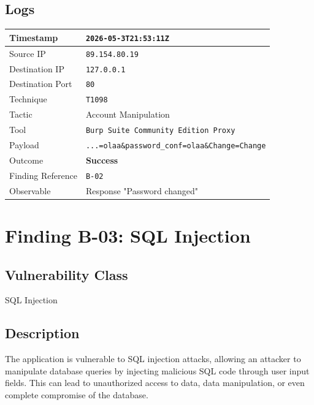 \documentclass[11pt,a4paper]{report}
\begin{document}
    \subsection*{Logs}
    
    \begin{table}[h!]
    \centering
    \renewcommand{\arraystretch}{1.3}
    \begin{tabular}{|p{4cm}|p{9cm}|}
    \hline
    Timestamp & \texttt{2026-05-3T21:53:11Z} \\
    \hline
    Source IP & \texttt{89.154.80.19} \\
    \hline
    Destination IP & \texttt{127.0.0.1} \\
    \hline
    Destination Port & \texttt{80} \\
    \hline
    Technique & \texttt{T1098} \\
    \hline
    Tactic & Account Manipulation \\
    \hline
    Tool & \texttt{Burp Suite Community Edition Proxy} \\
    \hline
    Payload & \texttt{...=olaa\&password\_conf=olaa\&Change=Change} \\
    \hline
    Outcome & \textbf{Success} \\
    \hline
    Finding Reference & \texttt{B-02} \\
    \hline
    Observable & Response "Password changed" \\
    \hline
    \end{tabular}
    \end{table}

    \newpage

    \section{Finding B-03: SQL Injection}
    \label{sec:finding-b03}

    \subsection*{Vulnerability Class}
    SQL Injection

    \subsection*{Description}
    The application is vulnerable to SQL injection attacks, allowing an attacker to manipulate database queries by injecting malicious SQL code through user input fields. This can lead to unauthorized access to data, data manipulation, or even complete compromise of the database.
\end{document}
